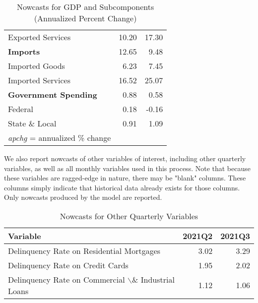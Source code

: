 \documentclass[11pt, letterpaper]{article}\usepackage[]{graphicx}\usepackage[]{color}
\begin{document}
\begin{table}[H]
\begin{tabular}{lrr}
  \hspace{8mm}  Exported Services & 10.20 & 17.30 \\ 
  \hspace{0mm} \textbf{Imports} & 12.65 & 9.48 \\ 
  \hspace{8mm}  Imported Goods & 6.23 & 7.45 \\ 
  \hspace{8mm}  Imported Services & 16.52 & 25.07 \\ 
  \hspace{0mm} \textbf{Government Spending} & 0.88 & 0.58 \\ 
  \hspace{8mm}  Federal & 0.18 & -0.16 \\ 
  \hspace{8mm}  State \& Local & 0.91 & 1.09 \\ 
   \hline 
 \textit{apchg} = annualized \% change 
\end{tabular}
\endgroup
\caption{Nowcasts for GDP and Subcomponents (Annualized Percent Change)} 
\end{table}


We also report nowcasts of other variables of interest, including other quarterly variables, as well as all monthly variables used in this process. Note that because these variables are ragged-edge in nature, there may be "blank" columns. These columns simply indicate that historical data already exists for those columns. Only nowcasts produced by the model are reported.
\begin{table}[H]
\centering
\begingroup\fontsize{11pt}{13pt}\selectfont
\begin{tabular}{lrr}
  \hline
Variable & 2021Q2 & 2021Q3 \\ 
  \hline
Delinquency Rate on Residential Mortgages & 3.02 & 3.29 \\ 
  Delinquency Rate on Credit Cards & 1.95 & 2.02 \\ 
  Delinquency Rate on Commercial $\backslash$\& Industrial Loans & 1.12 & 1.06 \\ 
   \hline
\end{tabular}
\endgroup
\caption{Nowcasts for Other Quarterly Variables} 
\end{table}
\end{document}
